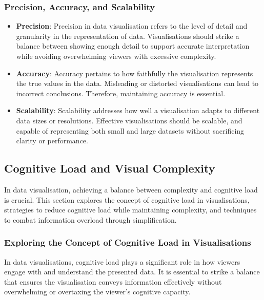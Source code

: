 \documentclass{article}\usepackage[]{graphicx}\usepackage[]{xcolor}
\begin{document}
\subsubsection{Precision, Accuracy, and Scalability}
\begin{itemize}
    \item \textbf{Precision}: Precision in data visualisation refers to the level of detail and granularity in the representation of data. Visualisations should strike a balance between showing enough detail to support accurate interpretation while avoiding overwhelming viewers with excessive complexity.
    \item \textbf{Accuracy}: Accuracy pertains to how faithfully the visualisation represents the true values in the data. Misleading or distorted visualisations can lead to incorrect conclusions. Therefore, maintaining accuracy is essential.
    \item \textbf{Scalability}: Scalability addresses how well a visualisation adapts to different data sizes or resolutions. Effective visualisations should be scalable, and capable of representing both small and large datasets without sacrificing clarity or performance.
\end{itemize}

\subsection{Cognitive Load and Visual Complexity}
In data visualisation, achieving a balance between complexity and cognitive load is crucial. This section explores the concept of cognitive load in visualisations, strategies to reduce cognitive load while maintaining complexity, and techniques to combat information overload through simplification.

\subsubsection{Exploring the Concept of Cognitive Load in Visualisations}
In data visualisations, cognitive load plays a significant role in how viewers engage with and understand the presented data. It is essential to strike a balance that ensures the visualisation conveys information effectively without overwhelming or overtaxing the viewer's cognitive capacity.
\end{document}
